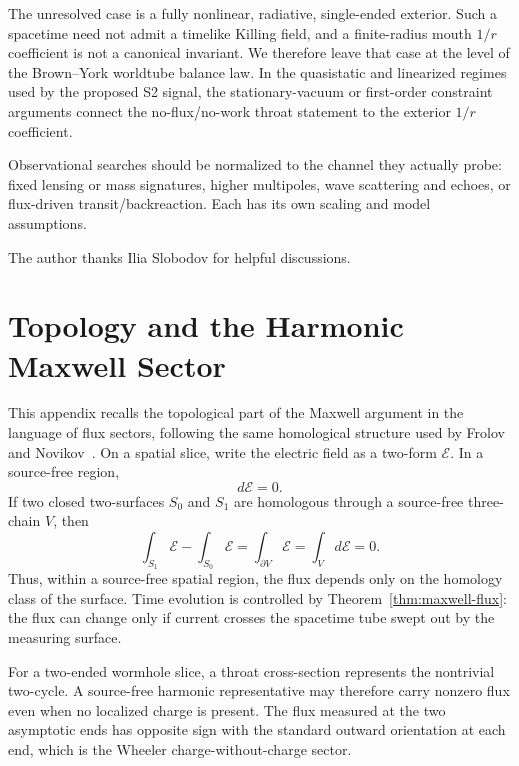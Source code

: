 \documentclass[aps,prd,10pt,onecolumn,nofootinbib,superscriptaddress,floatfix]{revtex4-2}
\begin{document}
The unresolved case is a fully nonlinear, radiative, single-ended exterior.
Such a spacetime need not admit a timelike Killing field, and a finite-radius
mouth $1/r$ coefficient is not a canonical invariant.  We therefore leave that
case at the level of the Brown--York worldtube balance law.  In the
quasistatic and linearized regimes used by the proposed S2 signal, the
stationary-vacuum or first-order constraint arguments connect the
no-flux/no-work throat statement to the exterior $1/r$ coefficient.

Observational searches should be normalized to the channel they actually probe:
fixed lensing or mass signatures, higher multipoles, wave scattering and
echoes, or flux-driven transit/backreaction.  Each has its own scaling and
model assumptions.

\begin{acknowledgments}
The author thanks Ilia Slobodov for helpful discussions.
\end{acknowledgments}

\appendix

\section{Topology and the Harmonic Maxwell Sector}
\label{app:cohomology}

This appendix recalls the topological part of the Maxwell argument in the
language of flux sectors, following the same homological structure used by
Frolov and Novikov~\cite{FrolovNovikov1990PhysicalEffects}.  On a spatial
slice, write the electric field as a two-form $\mathcal E$.  In a source-free
region,
\begin{equation}
  d\mathcal E=0 .
\end{equation}
If two closed two-surfaces $S_0$ and $S_1$ are homologous through a source-free
three-chain $V$, then
\begin{equation}
  \int_{S_1}\mathcal E-\int_{S_0}\mathcal E
  =
  \int_{\partial V}\mathcal E
  =
  \int_V d\mathcal E
  =
  0 .
\end{equation}
Thus, within a source-free spatial region, the flux depends only on the
homology class of the surface.  Time evolution is controlled by
Theorem~\ref{thm:maxwell-flux}: the flux can change only if current
crosses the spacetime tube swept out by the measuring surface.

For a two-ended wormhole slice, a throat cross-section represents the
nontrivial two-cycle.  A source-free harmonic representative may therefore
carry nonzero flux even when no localized charge is present.  The flux measured
at the two asymptotic ends has opposite sign with the standard outward
orientation at each end, which is the Wheeler charge-without-charge sector.
\end{document}
